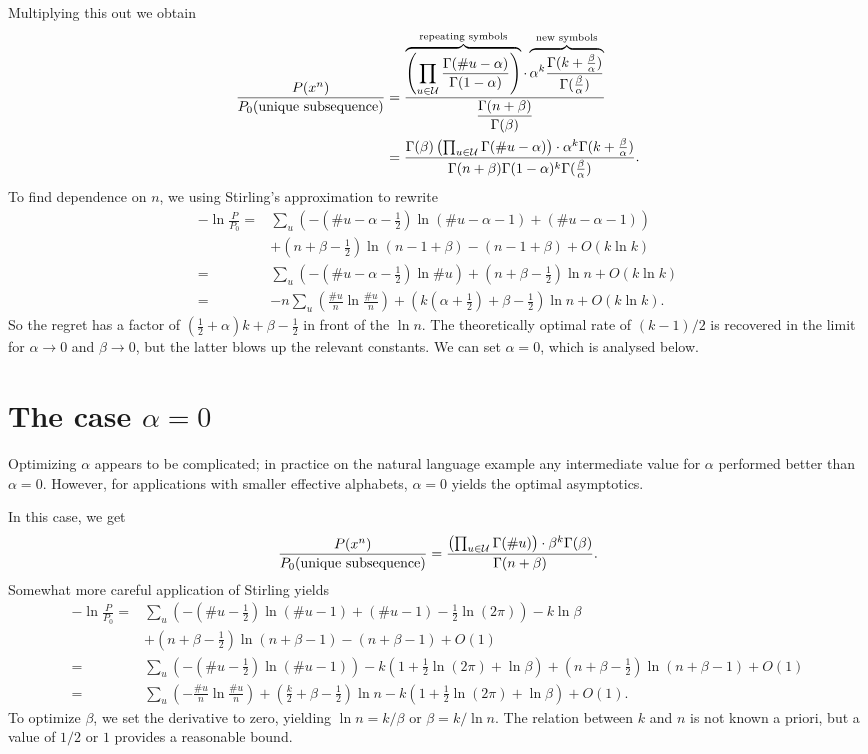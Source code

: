 \documentclass{article}
\newcommand{\U}{{\mathcal U}}
\newcommand{\tn}{\textnormal}
\begin{document}
Multiplying this out we obtain
\[\begin{split}
\frac{P(x^n)}{P_0(\tn{unique subsequence})}&=\frac{\overbrace{\left(\prod_{u\in\U}
    \frac{\Gamma(\#u-\alpha)}{\Gamma(1-\alpha)}\right)}^{\tn{repeating
  symbols}}\cdot\overbrace{\alpha^k\frac{\Gamma(k+\frac{\beta}{\alpha})}{\Gamma(\frac{\beta}{\alpha})}}^{\tn{new
  symbols}}}{\displaystyle\frac{\Gamma(n+\beta)}{\Gamma(\beta)}}\\
&=\frac{\Gamma(\beta)\left(\prod_{u\in\U}
   \Gamma(\#u-\alpha)\right)\cdot \alpha^k\Gamma(k+\frac{\beta}{\alpha})}{\Gamma(n+\beta)\Gamma(1-\alpha)^k\Gamma(\frac{\beta}{\alpha})}.
\end{split}
\]
To find dependence on $n$, we using Stirling's approximation to rewrite
%
\[\begin{split}
-\ln\frac{P}{P_0} =& 
\sum_u\left(
-(\#u-\alpha-\tfrac{1}{2})\ln(\#u-\alpha-1)+(\#u-\alpha-1)\right)\\
&+(n+\beta-\tfrac{1}{2})\ln(n-1+\beta)-(n-1+\beta)+O(k\ln k)\\
=& 
\sum_u\left(
-(\#u-\alpha-\tfrac{1}{2})\ln \#u\right)+(n+\beta-\tfrac{1}{2})\ln
n+O(k\ln k)\\
=& 
-n\sum_u\left(\frac{\#u}{n}\ln\frac{\#u}{n}\right)+(k(\alpha+\tfrac{1}{2})+\beta-\tfrac{1}{2})\ln
  n+O(k\ln k).
\end{split}
\]
So the regret has a factor of 
$(\tfrac{1}{2}+\alpha)k+\beta-\tfrac{1}{2}$ in front of the $\ln n$.
The theoretically optimal rate of $(k-1)/2$ is recovered in the limit
for $\alpha\to0$ and $\beta\to0$, but the latter blows up the relevant
constants. We can set $\alpha=0$, which is analysed below. 

\section{The case $\alpha=0$}
Optimizing $\alpha$ appears to be complicated; in practice on the
natural language example any intermediate value for $\alpha$ performed
better than $\alpha=0$. However, for applications with smaller
effective alphabets, $\alpha=0$ yields the optimal asymptotics.

In this case, we get
\[
\frac{P(x^n)}{P_0(\tn{unique subsequence})}=\frac{\left(\prod_{u\in\U}
    \Gamma(\#u)\right)\cdot \beta^k\Gamma(\beta)}{\Gamma(n+\beta)}.
\]
Somewhat more careful application of Stirling yields
\[
\begin{split}
-\ln\frac{P}{P_0}=&\sum_u\left(
-(\#u-\tfrac{1}{2})\ln(\#u-1)+(\#u-1)-\tfrac{1}{2}\ln(2\pi)\right)-k\ln\beta\\
&+(n+\beta-\tfrac{1}{2})\ln(n+\beta-1)-(n+\beta-1)+O(1)\\
=&\sum_u\left(
-(\#u-\tfrac{1}{2})\ln(\#u-1)\right)-k\left(1+\tfrac{1}{2}\ln(2\pi)+\ln\beta\right)+(n+\beta-\tfrac{1}{2})\ln(n+\beta-1)+O(1)\\
=&\sum_u\left(-\frac{\#u}{n}\ln\frac{\#u}{n}\right)+\left(\frac{k}{2}+\beta-\tfrac{1}{2}\right)\ln n-k\left(1+\tfrac{1}{2}\ln(2\pi)+\ln\beta\right)+O(1).
\end{split}
\]
To optimize $\beta$, we set the derivative to zero, yielding $\ln n =
k/\beta$ or $\beta=k/\ln n$. The relation between
$k$ and $n$ is not known a priori, but a value of $1/2$ or $1$ provides a reasonable bound.


\end{document}

